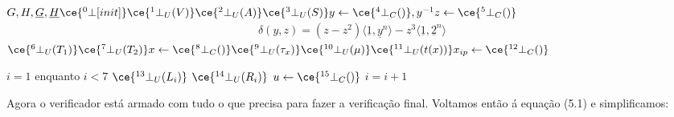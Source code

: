 \newpage
$
G, H, \underline{G}, \underline{H} \hspace*{\fill} \ce{^{0}_{\ }\bot[init]} \newline
\hspace*{\fill} \ce{^{1}_{\ }\bot_U(V)} \newline
\hspace*{\fill} \ce{^{2}_{\ }\bot_U(A)} \newline
\hspace*{\fill} \ce{^{3}_{\ }\bot_U(S)} \newline
y\leftarrow \ce{^{4}_{\ }\bot_C()}, y^{-1} \newline
z\leftarrow \ce{^{5}_{\ }\bot_C()} \newline
$
\begin{align*}
\delta(y,z) = (z - z^2)  \langle \underline{1}, \underline{y}^n \rangle - z^3 \langle \underline{1}, \underline{2}^n \rangle
\end{align*}
$
\hspace*{\fill} \ce{^{6}_{\ }\bot_U(T_1)} \newline
\hspace*{\fill} \ce{^{7}_{\ }\bot_U(T_2)} \newline
x\leftarrow \ce{^{8}_{\ }\bot_C()} \newline
\hspace*{\fill}\ce{^{9}_{\ }\bot_U(\tau_x)} \newline
\hspace*{\fill}\ce{^{10}_{\ }\bot_U(\mu)} \newline
\hspace*{\fill}\ce{^{11}_{\ }\bot_U(t(x))} \newline
x_{ip}\leftarrow \ce{^{12}_{\ }\bot_C()} \newline
$

$i=1$\newline
enquanto $i < 7$\newline
$\hspace*{\fill}\ce{^{13}_{\ }\bot_U(L_i)}$ \newline
$\hspace*{\fill}\ce{^{14}_{\ }\bot_U(R_i)}$ \newline
$u\leftarrow \ce{^{15}_{\ }\bot_C()}$ \newline
$i=i+1$

Agora o verificador está armado com tudo o que precisa para fazer a verificação final. Voltamos então á equação (5.1) e simplificamos:\newline

